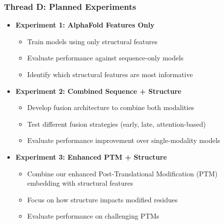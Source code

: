 \documentclass{beamer}
\begin{document}
\begin{frame}
  \frametitle{Thread D: Planned Experiments}
  \begin{itemize}
    \item \textbf{Experiment 1: AlphaFold Features Only}
    \begin{itemize}
      \item Train models using only structural features
      \item Evaluate performance against sequence-only models
      \item Identify which structural features are most informative
    \end{itemize}
    \item \textbf{Experiment 2: Combined Sequence + Structure}
    \begin{itemize}
      \item Develop fusion architecture to combine both modalities
      \item Test different fusion strategies (early, late, attention-based)
      \item Evaluate performance improvement over single-modality models
    \end{itemize}
    \item \textbf{Experiment 3: Enhanced PTM + Structure}
    \begin{itemize}
      \item Combine our enhanced Post-Translational Modification (PTM) embedding with structural features
      \item Focus on how structure impacts modified residues
      \item Evaluate performance on challenging PTMs
    \end{itemize}
  \end{itemize}
\end{frame}
\end{document}
